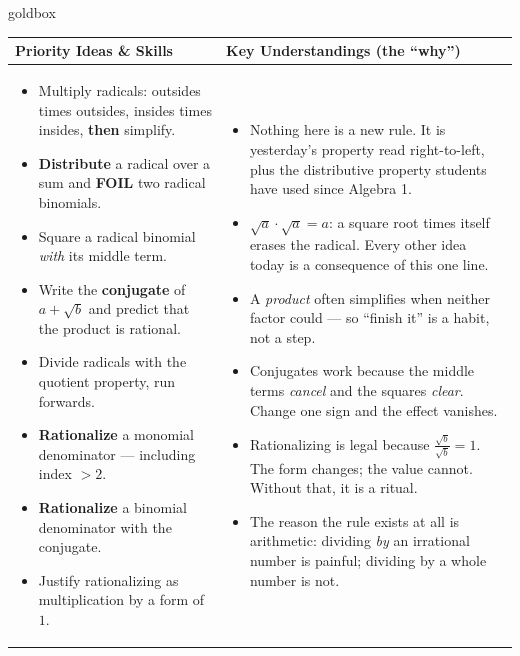 \documentclass[10pt]{article}
\begin{document}
\renewcommand{\arraystretch}{1.4}
\begin{skillbox}{goldbox}
\begin{tabularx}{\linewidth}{@{}X|X@{}}
\textbf{Priority Ideas \& Skills} & \textbf{Key Understandings (the ``why'')} \\[2pt]
\hline
\vspace{-6pt}
\begin{itemize}[leftmargin=1.1em, nosep, after=\vspace{2pt}]
  \item Multiply radicals: outsides times outsides, insides times insides, \textbf{then} simplify.
  \item \textbf{Distribute} a radical over a sum and \textbf{FOIL} two radical binomials.
  \item Square a radical binomial \emph{with} its middle term.
  \item Write the \textbf{conjugate} of $a+\sqrt b$ and predict that the product is rational.
  \item Divide radicals with the quotient property, run forwards.
  \item \textbf{Rationalize} a monomial denominator --- including index $>2$.
  \item \textbf{Rationalize} a binomial denominator with the conjugate.
  \item Justify rationalizing as multiplication by a form of $1$.
\end{itemize}
&
\vspace{-6pt}
\begin{itemize}[leftmargin=1.1em, nosep, after=\vspace{2pt}]
  \item Nothing here is a new rule. It is yesterday's property read right-to-left, plus the
        distributive property students have used since Algebra 1.
  \item \textbf{$\sqrt a\cdot\sqrt a=a$}: a square root times itself erases the radical. Every
        other idea today is a consequence of this one line.
  \item A \emph{product} often simplifies when neither factor could --- so ``finish it'' is a habit,
        not a step.
  \item Conjugates work because the middle terms \emph{cancel} and the squares \emph{clear}. Change
        one sign and the effect vanishes.
  \item Rationalizing is legal because $\frac{\sqrt b}{\sqrt b}=1$. The form changes; the value
        cannot. Without that, it is a ritual.
  \item The reason the rule exists at all is arithmetic: dividing \emph{by} an irrational number is
        painful; dividing by a whole number is not.
\end{itemize}
\end{tabularx}
\end{skillbox}
\end{document}

